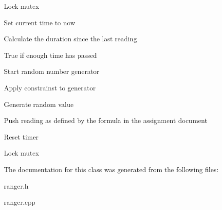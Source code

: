 Lock mutex

Set current time to now

Calculate the duration since the last reading

True if enough time has passed

Start random number generator

Apply constrainst to generator

Generate random value

Push reading as defined by the formula in the assignment document

Reset timer

Lock mutex 

The documentation for this class was generated from the following files\+:\begin{DoxyCompactItemize}
\item 
ranger.\+h\item 
ranger.\+cpp\end{DoxyCompactItemize}
